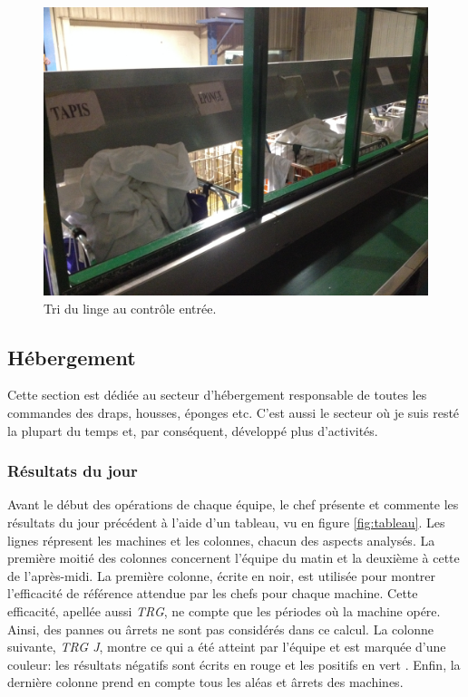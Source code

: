 \documentclass{article}
\newcommand{\rapportFigure}{0.075}
\begin{document}
\FloatBarrier

%
\begin{figure}[h]
    \centering
    \includegraphics[scale= \rapportFigure]{images/entree_tri}
    \caption{Tri du linge au contrôle entrée.}
    \label{fig:entree_tri}
\end{figure}
%
\FloatBarrier

\subsection{Hébergement}

Cette section est dédiée au secteur d'hébergement responsable de toutes les
commandes des draps, housses, éponges etc. C'est aussi le secteur où je suis
resté la plupart du temps et, par conséquent, développé plus d'activités.

\subsubsection{Résultats du jour}
\label{sec:resultat}

Avant le début des opérations de chaque équipe, le chef présente et commente
les résultats du jour précédent à l'aide d'un tableau, vu en figure
\ref{fig:tableau}. Les lignes répresent les machines et les colonnes, chacun
des aspects analysés. La première moitié des colonnes concernent l'équipe du
matin et la deuxième à cette de l'après-midi. La première colonne, écrite en
noir, est utilisée pour montrer l'efficacité de référence attendue par les chefs
pour chaque machine. Cette efficacité, apellée aussi \textit{TRG}, ne compte que les
périodes où la machine opére. Ainsi, des pannes ou ârrets ne sont pas
considérés dans ce calcul. La colonne suivante, \textit{TRG J}, montre ce qui a
été atteint par l'équipe et est marquée d'une couleur: les résultats négatifs
sont écrits en rouge et les positifs en vert . Enfin, la dernière colonne prend en
compte tous les aléas et ârrets des machines.
\end{document}

